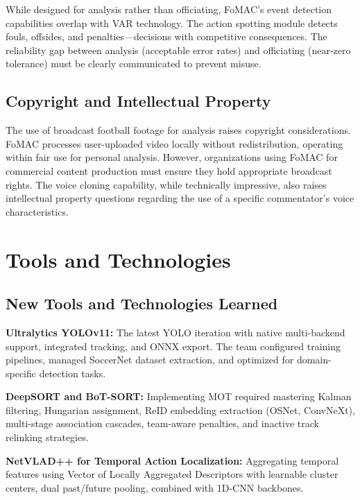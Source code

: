 \documentclass[10pt,twocolumn,a4paper]{article}
\begin{document}
While designed for analysis rather than officiating, FoMAC's event detection capabilities overlap with VAR technology. The action spotting module detects fouls, offsides, and penalties---decisions with competitive consequences. The reliability gap between analysis (acceptable error rates) and officiating (near-zero tolerance) must be clearly communicated to prevent misuse.

\subsection{Copyright and Intellectual Property}

The use of broadcast football footage for analysis raises copyright considerations. FoMAC processes user-uploaded video locally without redistribution, operating within fair use for personal analysis. However, organizations using FoMAC for commercial content production must ensure they hold appropriate broadcast rights. The voice cloning capability, while technically impressive, also raises intellectual property questions regarding the use of a specific commentator's voice characteristics.

\section{Tools and Technologies}

\subsection{New Tools and Technologies Learned}

\textbf{Ultralytics YOLOv11:} The latest YOLO iteration with native multi-backend support, integrated tracking, and ONNX export. The team configured training pipelines, managed SoccerNet dataset extraction, and optimized for domain-specific detection tasks.

\textbf{DeepSORT and BoT-SORT:} Implementing MOT required mastering Kalman filtering, Hungarian assignment, ReID embedding extraction (OSNet, ConvNeXt), multi-stage association cascades, team-aware penalties, and inactive track relinking strategies.

\textbf{NetVLAD++ for Temporal Action Localization:} Aggregating temporal features using Vector of Locally Aggregated Descriptors with learnable cluster centers, dual past/future pooling, combined with 1D-CNN backbones.
\end{document}
